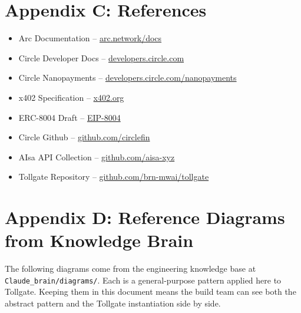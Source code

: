 \documentclass[11pt,a4paper]{article}
\newcommand{\iconCog}{\textcolor{tollgateslate}{\faCog}}
\begin{document}
\section*{Appendix C: References}

\begin{itemize}[leftmargin=*]
  \item Arc Documentation -- \href{https://arc.network/docs}{arc.network/docs}
  \item Circle Developer Docs -- \href{https://developers.circle.com}{developers.circle.com}
  \item Circle Nanopayments -- \href{https://developers.circle.com/nanopayments}{developers.circle.com/nanopayments}
  \item x402 Specification -- \href{https://x402.org}{x402.org}
  \item ERC-8004 Draft -- \href{https://eips.ethereum.org/EIPS/eip-8004}{EIP-8004}
  \item Circle Github -- \href{https://github.com/circlefin}{github.com/circlefin}
  \item AIsa API Collection -- \href{https://github.com/aisa-xyz}{github.com/aisa-xyz}
  \item Tollgate Repository -- \href{https://github.com/brn-mwai/tollgate}{github.com/brn-mwai/tollgate}
\end{itemize}

\newpage

\section*{Appendix D: Reference Diagrams from Knowledge Brain}

\begin{archbox}[title={\iconCog~ Provenance}]
The following diagrams come from the engineering knowledge base at \texttt{Claude\_brain/diagrams/}. Each is a general-purpose pattern applied here to Tollgate. Keeping them in this document means the build team can see both the abstract pattern and the Tollgate instantiation side by side.
\end{archbox}
\end{document}
